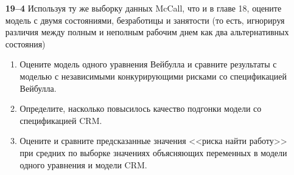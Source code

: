 \begin{enumerate}
    \item[\textbf{19--4}]
Используя ту же выборку данных McCall, что и в главе 18, %
оцените модель с двумя состояниями, безработицы и занятости (то есть, игнорируя различия между полным и неполным рабочим днем как два альтернативных состояния)
        \begin{enumerate}
        \item
Оцените модель одного уравнения Вейбулла и сравните результаты с моделью с независимыми конкурирующими рисками со спецификацией Вейбулла.
        \item
Определите, насколько повысилось качество подгонки модели со спецификацией CRM.
        \item
Оцените и сравните предсказанные значения <<риска найти работу>> при средних по выборке значениях объясняющих переменных в модели одного уравнения и модели CRM.
        \end{enumerate}

\end{enumerate}
